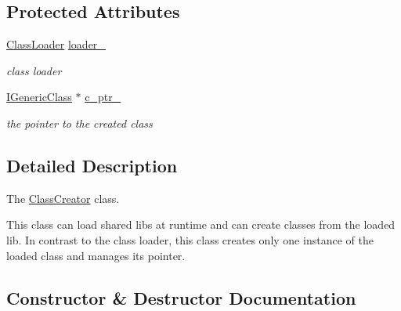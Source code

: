 \subsection*{Protected Attributes}
\begin{DoxyCompactItemize}
\item 
\hyperlink{classow__plugin__loader_1_1ClassLoader}{Class\+Loader} \hyperlink{classow__plugin__loader_1_1ClassCreator_aded4b5806eac1add44b05a92f60d3596}{loader\+\_\+}\hypertarget{classow__plugin__loader_1_1ClassCreator_aded4b5806eac1add44b05a92f60d3596}{}\label{classow__plugin__loader_1_1ClassCreator_aded4b5806eac1add44b05a92f60d3596}

\begin{DoxyCompactList}\small\item\em class loader \end{DoxyCompactList}\item 
\hyperlink{classow__core_1_1IGenericClass}{I\+Generic\+Class} $\ast$ \hyperlink{classow__plugin__loader_1_1ClassCreator_a4bf4cda4e02e535f9d7e675a31241187}{c\+\_\+ptr\+\_\+}\hypertarget{classow__plugin__loader_1_1ClassCreator_a4bf4cda4e02e535f9d7e675a31241187}{}\label{classow__plugin__loader_1_1ClassCreator_a4bf4cda4e02e535f9d7e675a31241187}

\begin{DoxyCompactList}\small\item\em the pointer to the created class \end{DoxyCompactList}\end{DoxyCompactItemize}


\subsection{Detailed Description}
The \hyperlink{classow__plugin__loader_1_1ClassCreator}{Class\+Creator} class. 

This class can load shared libs at runtime and can create classes from the loaded lib. In contrast to the class loader, this class creates only one instance of the loaded class and manages its pointer. 

\subsection{Constructor \& Destructor Documentation}

